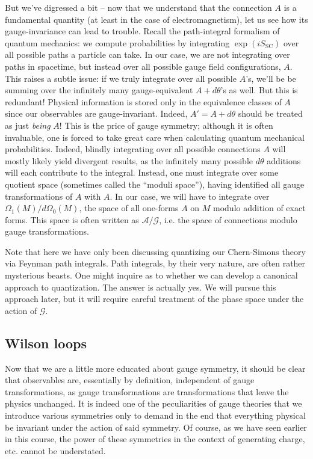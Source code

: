 \documentclass[12pt]{article}
\begin{document}
But we've digressed a bit -- now that we understand that the connection $A$ is a fundamental quantity (at least in the case of electromagnetism), let us see how its gauge-invariance can lead to trouble. Recall the path-integral formalism of quantum mechanics: we compute probabilities by integrating $\exp(iS_{\text{SC}})$ over all possible paths a particle can take. In our case, we are not integrating over paths in spacetime, but instead over all possible gauge field configurations, $A$. This raises a subtle issue: if we truly integrate over all possible $A$'s, we'll be be summing over the infinitely many gauge-equivalent $A+d\theta$'s as well. But this is redundant! Physical information is stored only in the equivalence classes of $A$ since our observables are gauge-invariant. Indeed, $A'=A+d\theta$ should be treated as just \textit{being} $A$! This is the price of gauge symmetry; although it is often invaluable, one is forced to take great care when calculating quantum mechanical probabilities. Indeed, blindly integrating over all possible connections $A$ will mostly likely yield divergent results, as the infinitely many possible $d\theta$ additions will each contribute to the integral. Instead, one must integrate over some quotient space (sometimes called the ``moduli space''), having identified all gauge transformations of $A$ with $A$. In our case, we will have to integrate over $\Omega_1(M)/d\Omega_0(M)$, the space of all one-forms $A$ on $M$ modulo addition of exact forms. This space is often written as $\mathcal{A}/\mathcal{G}$, i.e. the space of connections modulo gauge transformations.

Note that here we have only been discussing quantizing our Chern-Simons theory via Feynman path integrals. Path integrals, by their very nature, are often rather mysterious beasts. One might inquire as to whether we can develop a canonical approach to quantization. The answer is actually yes. We will pursue this approach later, but it will require careful treatment of the phase space under the action of $\mathcal{G}$.

\subsection*{Wilson loops}

Now that we are a little more educated about gauge symmetry, it should be clear that observables are, essentially by definition, independent of gauge transformations, as gauge transformations are transformations that leave the physics unchanged. It is indeed one of the peculiarities of gauge theories that we introduce various symmetries only to demand in the end that everything physical be invariant under the action of said symmetry. Of course, as we have seen earlier in this course, the power of these symmetries in the context of generating charge, etc. cannot be understated.
\end{document}
